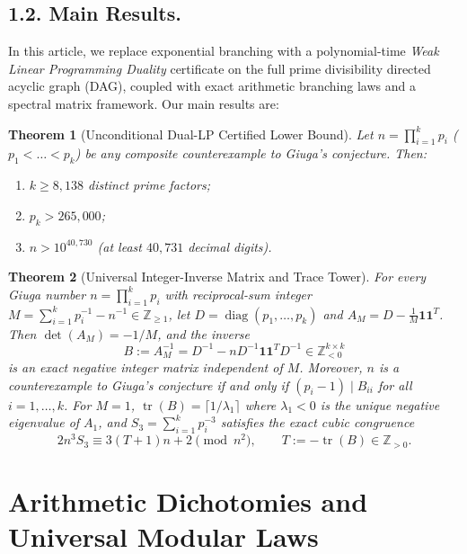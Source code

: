 \documentclass[11pt]{amsart}
\newtheorem{theorem}{Theorem}[section]
\theoremstyle{definition}
\theoremstyle{remark}
\numberwithin{equation}{section}
\begin{document}
\subsection*{1.2. Main Results.}
In this article, we replace exponential branching with a polynomial-time \emph{Weak Linear Programming Duality} certificate on the full prime divisibility directed acyclic graph (DAG), coupled with exact arithmetic branching laws and a spectral matrix framework. Our main results are:

\begin{theorem}[Unconditional Dual-LP Certified Lower Bound]\label{thm:main}
Let $n = \prod_{i=1}^k p_i$ ($p_1 < \dots < p_k$) be any composite counterexample to Giuga's conjecture. Then:
\begin{enumerate}
    \item $k \ge 8{,}138$ distinct prime factors;
    \item $p_k > 265{,}000$;
    \item $n > 10^{40{,}730}$ (at least $40{,}731$ decimal digits).
\end{enumerate}
\end{theorem}

\begin{theorem}[Universal Integer-Inverse Matrix and Trace Tower]\label{thm:matrix}
For every Giuga number $n = \prod_{i=1}^k p_i$ with reciprocal-sum integer $M = \sum_{i=1}^k p_i^{-1} - n^{-1} \in \mathbb{Z}_{\ge 1}$, let $D = \operatorname{diag}(p_1,\dots,p_k)$ and $A_M = D - \frac{1}{M}\mathbf{1}\mathbf{1}^T$. Then $\det(A_M) = -1/M$, and the inverse
\[
    B := A_M^{-1} = D^{-1} - n D^{-1}\mathbf{1}\mathbf{1}^T D^{-1} \in \mathbb{Z}_{<0}^{k \times k}
\]
is an exact negative integer matrix independent of $M$. Moreover, $n$ is a counterexample to Giuga's conjecture if and only if $(p_i - 1) \mid B_{ii}$ for all $i = 1,\dots,k$. For $M = 1$, $\operatorname{tr}(B) = \lceil 1/\lambda_1 \rceil$ where $\lambda_1 < 0$ is the unique negative eigenvalue of $A_1$, and $S_3 = \sum_{i=1}^k p_i^{-3}$ satisfies the exact cubic congruence
\[
    2 n^3 S_3 \equiv 3(T + 1)n + 2 \pmod{n^2}, \qquad T := -\operatorname{tr}(B) \in \mathbb{Z}_{>0}.
\]
\end{theorem}

\section{Arithmetic Dichotomies and Universal Modular Laws}
\end{document}
